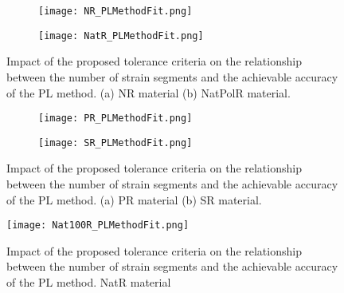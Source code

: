 \begin{figure}[H]
	\centering
	\begin{subfigure}[b]{0.9\textwidth}
		\centering
		\texttt{[image: NR\_PLMethodFit.png]}
		\caption{}
		\label{fig:SegmentsNR}
	\end{subfigure}
	\begin{subfigure}[b]{0.9\textwidth}
		\centering
		\texttt{[image: NatR\_PLMethodFit.png]}
		\caption{}
		\label{fig:SegmentsNatR}
	\end{subfigure}
	\caption{Impact of the proposed tolerance criteria on the relationship between the number of strain segments and the achievable accuracy of the PL method. (a) NR material (b) NatPolR material.}
	\label{fig:SegmentsNR_NatR}
\end{figure}

\begin{figure}[H]
	\centering
	\begin{subfigure}[b]{0.9\textwidth}
		\centering
		\texttt{[image: PR\_PLMethodFit.png]}
		\caption{}
		\label{fig:SegmentsPR}
	\end{subfigure}
	\begin{subfigure}[b]{0.9\textwidth}
		\centering
		\texttt{[image: SR\_PLMethodFit.png]}
		\caption{}
		\label{fig:SegmentsSR}
	\end{subfigure}
	\caption{Impact of the proposed tolerance criteria on the relationship between the number of strain segments and the achievable accuracy of the PL method. (a) PR material (b) SR material.}
	\label{fig:SegmentsPR_SR}
\end{figure}

\begin{figure}[H]
	\centering
	\texttt{[image: Nat100R\_PLMethodFit.png]}
	\caption{Impact of the proposed tolerance criteria on the relationship between the number of strain segments and the achievable accuracy of the PL method. NatR material}
	\label{fig:SegmentsNat100R}
\end{figure}

